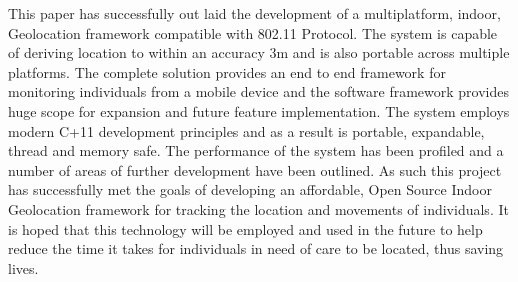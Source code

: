 \documentclass[conference]{IEEEtran}
\begin{document}
This paper has successfully out laid the development of a multiplatform, indoor, Geolocation framework compatible with 802.11 Protocol. The system is capable of deriving location to within an accuracy 3m and is also portable across multiple platforms. The complete solution provides an end to end framework for monitoring individuals from a mobile device and the software framework provides huge scope for expansion and future feature implementation. The system employs modern C+11 development principles and as a result is portable, expandable, thread and memory safe. The performance of the system has been profiled and a number of areas of further development have been outlined. As such this project has successfully met the goals of developing an affordable, Open Source Indoor Geolocation framework for tracking the location and movements of individuals. It is hoped that this technology will be employed and used in the future to help reduce the time it takes for individuals in need of care to be located, thus saving lives.
\printbibliography
\end{document}
